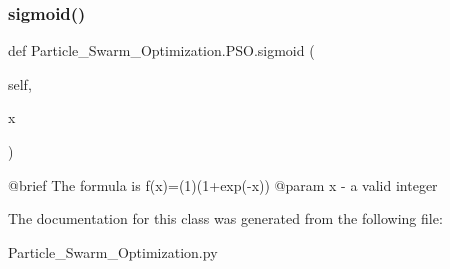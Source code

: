 \subsubsection{\texorpdfstring{sigmoid()}{sigmoid()}}
{\footnotesize\ttfamily def Particle\+\_\+\+Swarm\+\_\+\+Optimization.\+P\+S\+O.\+sigmoid (\begin{DoxyParamCaption}\item[{}]{self,  }\item[{}]{x }\end{DoxyParamCaption})}

\begin{DoxyVerb}@brief The formula is  f(x)=(1)(1+exp(-x))
@param x - a valid integer\end{DoxyVerb}
 

The documentation for this class was generated from the following file\+:\begin{DoxyCompactItemize}
\item 
Particle\+\_\+\+Swarm\+\_\+\+Optimization.\+py\end{DoxyCompactItemize}
